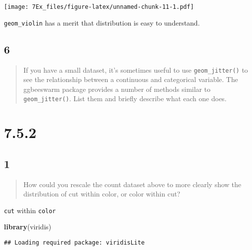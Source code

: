 \documentclass[]{article}
\newenvironment{Shaded}{\begin{snugshade}}{\end{snugshade}}
\newcommand{\DataTypeTok}[1]{\textcolor[rgb]{0.13,0.29,0.53}{#1}}
\newcommand{\DecValTok}[1]{\textcolor[rgb]{0.00,0.00,0.81}{#1}}
\newcommand{\KeywordTok}[1]{\textcolor[rgb]{0.13,0.29,0.53}{\textbf{#1}}}
\newcommand{\NormalTok}[1]{#1}
\newcommand{\OperatorTok}[1]{\textcolor[rgb]{0.81,0.36,0.00}{\textbf{#1}}}
\newcommand{\StringTok}[1]{\textcolor[rgb]{0.31,0.60,0.02}{#1}}
\begin{document}
\texttt{[image: 7Ex\_files/figure-latex/unnamed-chunk-11-1.pdf]}

\texttt{geom\_violin} has a merit that distribution is easy to
understand.

\hypertarget{section-14}{%
\subsection{6}\label{section-14}}

\begin{quote}
If you have a small dataset, it's sometimes useful to use
\texttt{geom\_jitter()} to see the relationship between a continuous and
categorical variable. The ggbeeswarm package provides a number of
methods similar to \texttt{geom\_jitter()}. List them and briefly
describe what each one does.
\end{quote}

\hypertarget{section-15}{%
\section{7.5.2}\label{section-15}}

\hypertarget{section-16}{%
\subsection{1}\label{section-16}}

\begin{quote}
How could you rescale the count dataset above to more clearly show the
distribution of cut within color, or color within cut?
\end{quote}

\texttt{cut} within \texttt{color}

\begin{Shaded}
\begin{Highlighting}[]
\KeywordTok{library}\NormalTok{(viridis)}
\end{Highlighting}
\end{Shaded}

\begin{verbatim}
## Loading required package: viridisLite
\end{verbatim}

\begin{Shaded}
\end{Shaded}
\end{document}
